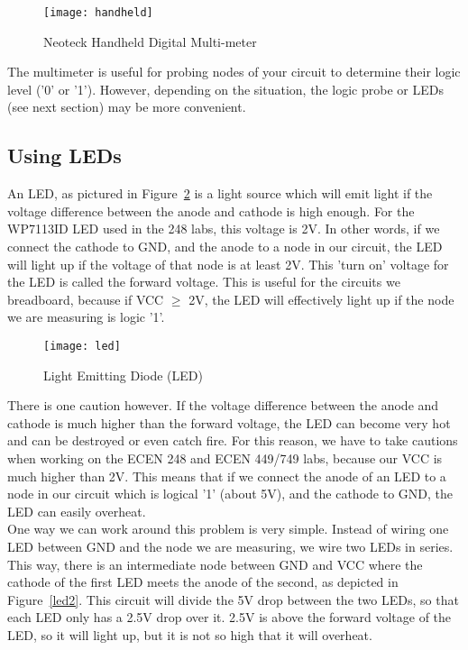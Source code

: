 \documentclass[11pt,twoside,titlepage]{article}
\begin{document}
\begin{figure}[!h]
	\centering 
	\texttt{[image: handheld]}
	\caption{Neoteck Handheld Digital Multi-meter}
	\label{handheld}
\end{figure}


\noindent
The multimeter is useful for probing nodes of your circuit to determine their logic level ('0' or '1'). However, depending on the situation, the logic probe or LEDs (see next section) may be more convenient.

\subsection{Using LEDs}

\noindent
An LED, as pictured in Figure~\ref{led} is a light source which will emit light if the voltage difference between the anode and cathode is high enough. For the WP7113ID LED used in the 248 labs, this voltage is 2V. In other words, if we connect the cathode to GND, and the anode to a node in our circuit, the LED will light up if the voltage of that node is at least 2V. This 'turn on' voltage for the LED is called the forward voltage. This is useful for the circuits we breadboard, because if VCC $\ge$ 2V, the LED will effectively light up if the node we are measuring is logic '1'.\\

\begin{figure}[!h]
	\centering 
	\texttt{[image: led]}
	\caption{Light Emitting Diode (LED)}
	\label{led}
\end{figure}

\noindent
There is one caution however. If the voltage difference between the anode and cathode is much higher than the forward voltage, the LED can become very hot and can be destroyed or even catch fire. For this reason, we have to take cautions when working on the ECEN 248 and ECEN 449/749 labs, because our VCC is much higher than 2V. This means that if we connect the anode of an LED to a node in our circuit which is logical '1' (about 5V), and the cathode to GND, the LED can easily overheat.\\

\noindent One way we can work around this problem is very simple. Instead of wiring one LED between GND and the node we are measuring, we wire two LEDs in series. This way, there is an intermediate node between GND and VCC where the cathode of the first LED meets the anode of the second, as depicted in Figure~\ref{led2}. This circuit will divide the 5V drop between the two LEDs, so that each LED only has a 2.5V drop over it. 2.5V is above the forward voltage of the LED, so it will light up, but it is not so high that it will overheat. \\
\end{document}
